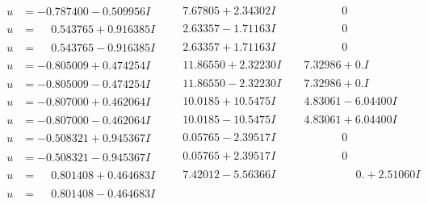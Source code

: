 \documentclass[1p]{elsarticle_modified}
\theoremstyle{definition}
\begin{document}
$$\begin{array}{c|c|c}
\begin{aligned}
u &= -0.787400 - 0.509956 I\end{aligned}
 & \phantom{-}7.67805 + 2.34302 I & \phantom{-0.000000 } 0 \\ \hline\begin{aligned}
u &= \phantom{-}0.543765 + 0.916385 I\end{aligned}
 & \phantom{-}2.63357 - 1.71163 I & \phantom{-0.000000 } 0 \\ \hline\begin{aligned}
u &= \phantom{-}0.543765 - 0.916385 I\end{aligned}
 & \phantom{-}2.63357 + 1.71163 I & \phantom{-0.000000 } 0 \\ \hline\begin{aligned}
u &= -0.805009 + 0.474254 I\end{aligned}
 & \phantom{-}11.86550 + 2.32230 I & \phantom{-}7.32986 + 0. I\phantom{ +0.000000I} \\ \hline\begin{aligned}
u &= -0.805009 - 0.474254 I\end{aligned}
 & \phantom{-}11.86550 - 2.32230 I & \phantom{-}7.32986 + 0. I\phantom{ +0.000000I} \\ \hline\begin{aligned}
u &= -0.807000 + 0.462064 I\end{aligned}
 & \phantom{-}10.0185 + 10.5475 I & \phantom{-}4.83061 - 6.04400 I \\ \hline\begin{aligned}
u &= -0.807000 - 0.462064 I\end{aligned}
 & \phantom{-}10.0185 - 10.5475 I & \phantom{-}4.83061 + 6.04400 I \\ \hline\begin{aligned}
u &= -0.508321 + 0.945367 I\end{aligned}
 & \phantom{-}0.05765 - 2.39517 I & \phantom{-0.000000 } 0 \\ \hline\begin{aligned}
u &= -0.508321 - 0.945367 I\end{aligned}
 & \phantom{-}0.05765 + 2.39517 I & \phantom{-0.000000 } 0 \\ \hline\begin{aligned}
u &= \phantom{-}0.801408 + 0.464683 I\end{aligned}
 & \phantom{-}7.42012 - 5.56366 I & \phantom{-0.000000 -}0. + 2.51060 I \\ \hline\begin{aligned}
u &= \phantom{-}0.801408 - 0.464683 I\end{aligned}

\end{array}$$
\end{document}

